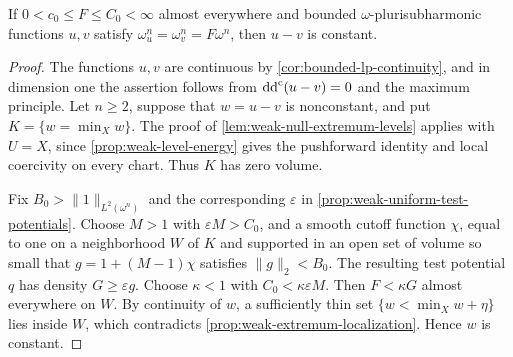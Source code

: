 \begin{corollary}\label{cor:bounded-positive-density-uniqueness}
If $0<c_0\leq F\leq C_0<\infty$ almost everywhere and bounded $\omega$-plurisubharmonic functions $u,v$ satisfy $\omega_u^n=\omega_v^n=F\omega^n$, then $u-v$ is constant.
\end{corollary}
\begin{proof}
The functions $u,v$ are continuous by \cref{cor:bounded-lp-continuity}, and in dimension one the assertion follows from $\mathrm{dd}^{\mathrm{c}}(u-v)=0$ and the maximum principle. Let $n\geq2$, suppose that $w=u-v$ is nonconstant, and put $K=\{w=\min_Xw\}$. The proof of \cref{lem:weak-null-extremum-levels} applies with $U=X$, since \cref{prop:weak-level-energy} gives the pushforward identity and local coercivity on every chart. Thus $K$ has zero volume.

Fix $B_0>\|1\|_{L^2(\omega^n)}$ and the corresponding $\varepsilon$ in \cref{prop:weak-uniform-test-potentials}. Choose $M>1$ with $\varepsilon M>C_0$, and a smooth cutoff function $\chi$, equal to one on a neighborhood $W$ of $K$ and supported in an open set of volume so small that $g=1+(M-1)\chi$ satisfies $\|g\|_2<B_0$. The resulting test potential $q$ has density $G\geq\varepsilon g$. Choose $\kappa<1$ with $C_0<\kappa\varepsilon M$. Then $F<\kappa G$ almost everywhere on $W$. By continuity of $w$, a sufficiently thin set $\{w<\min_Xw+\eta\}$ lies inside $W$, which contradicts \cref{prop:weak-extremum-localization}. Hence $w$ is constant.
\end{proof}
